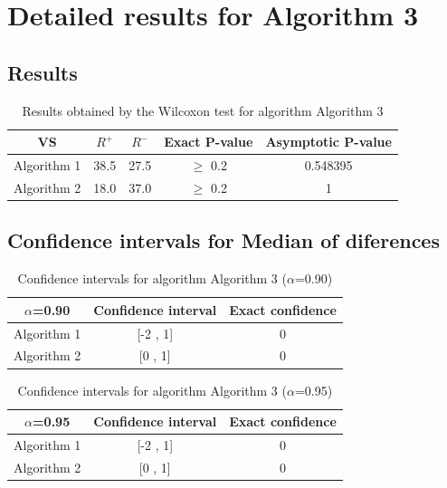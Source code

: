 \documentclass[a4paper,10pt]{article}
\begin{document}
 \clearpage 


\section{Detailed results for Algorithm 3}


\subsection{Results}

\begin{table}[!htp]
\centering\small
\begin{tabular}{
|c|c|c|c|c|}
\hline
 VS & $R^{+}$ & $R^{-}$ & Exact P-value & Asymptotic P-value \\ \hline 
Algorithm 1 & 38.5 & 27.5 & $\geq$ 0.2 & 0.548395\\ \hline 
Algorithm 2 & 18.0 & 37.0 & $\geq$ 0.2 & 1\\ \hline 

\end{tabular}
\caption{Results obtained by the Wilcoxon test for algorithm Algorithm 3}
\end{table}

\subsection{Confidence intervals for Median of diferences}

\begin{table}[!htp]
\centering\small
\begin{tabular}{
|c|c|c|}
\hline
 $\alpha$=0.90 & Confidence interval & Exact confidence \\ \hline 
Algorithm 1 & [-2 , 1] & 0\\ \hline 
Algorithm 2 & [0 , 1] & 0\\ \hline 

\end{tabular}
\caption{Confidence intervals for algorithm Algorithm 3 ($\alpha$=0.90)}
\end{table}
\begin{table}[!htp]
\centering\small
\begin{tabular}{
|c|c|c|}
\hline
 $\alpha$=0.95 & Confidence interval & Exact confidence \\ \hline 
Algorithm 1 & [-2 , 1] & 0\\ \hline 
Algorithm 2 & [0 , 1] & 0\\ \hline 

\end{tabular}
\caption{Confidence intervals for algorithm Algorithm 3 ($\alpha$=0.95)}
\end{table}

 \clearpage 
\end{document}
